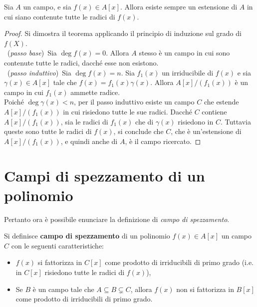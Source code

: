 \documentclass[11pt]{scrbook}
\begin{document}
\begin{theorem}
    \label{th:esistenza_spezzamento}
    Sia $A$ un campo, e sia $f(x) \in A[x]$.
    Allora esiste sempre un estensione di $A$ in cui siano
    contenute tutte le radici di $f(x)$.
\end{theorem}

\begin{proof}
    Si dimostra il teorema applicando il principio di induzione sul
    grado di $f(X)$. \\

    \ (\textit{passo base}) \,Sia $\deg f(x) = 0$. Allora $A$ stesso è un
    campo in cui sono contenute tutte le radici, dacché esse non esistono. \\

    \ (\textit{passo induttivo}) \,Sia $\deg f(x) = n$. Sia $f_1(x)$ un
    irriducibile di $f(x)$ e sia $\gamma(x) \in A[x]$ tale che
    $f(x)=f_1(x)\gamma(x)$. Allora $A[x]/(f_1(x))$ è un campo in cui
    $f_1(x)$ ammette radice. \\

    Poiché $\deg \gamma(x) < n$, per il passo induttivo
    esiste un campo $C$ che estende $A[x]/(f_1(x))$ in cui risiedono tutte le sue radici. Dacché $C$ contiene $A[x]/(f_1(x))$, sia le radici
    di $f_1(x)$ che di $\gamma(x)$ risiedono in $C$. Tuttavia queste sono
    tutte le radici di $f(x)$, si conclude che $C$, che è un'estensione di $A[x]/(f_1(x))$, e quindi anche di $A$, è il campo ricercato.
\end{proof}

\section{Campi di spezzamento di un polinomio}

Pertanto ora è possibile enunciare la definizione di \textit{campo di spezzamento}.

\begin{definition}
    Si definisce \textbf{campo di spezzamento} di un polinomio $f(x) \in A[x]$ un
    campo $C$ con le seguenti caratteristiche:

    \begin{itemize}
        \item $f(x)$ si fattorizza in $C[x]$ come prodotto di irriducibili di
              primo grado (i.e. in $C[x]$ risiedono tutte le radici di $f(x)$),
        \item Se $B$ è un campo tale che $A \subseteq B \subsetneq C$, allora
              $f(x)$ non si fattorizza in $B[x]$ come prodotto di irriducibili di
              primo grado.
    \end{itemize}
\end{definition}
\end{document}
